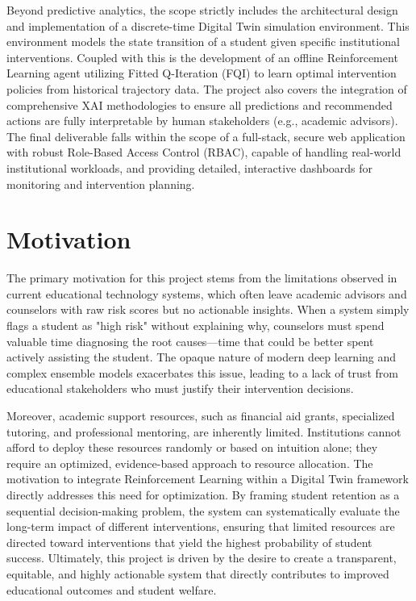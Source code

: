 \documentclass[12pt,a4paper]{report}
\begin{document}
Beyond predictive analytics, the scope strictly includes the architectural design and implementation of a discrete-time Digital Twin simulation environment. This environment models the state transition of a student given specific institutional interventions. Coupled with this is the development of an offline Reinforcement Learning agent utilizing Fitted Q-Iteration (FQI) to learn optimal intervention policies from historical trajectory data. The project also covers the integration of comprehensive XAI methodologies to ensure all predictions and recommended actions are fully interpretable by human stakeholders (e.g., academic advisors). The final deliverable falls within the scope of a full-stack, secure web application with robust Role-Based Access Control (RBAC), capable of handling real-world institutional workloads, and providing detailed, interactive dashboards for monitoring and intervention planning.

\section{Motivation}
The primary motivation for this project stems from the limitations observed in current educational technology systems, which often leave academic advisors and counselors with raw risk scores but no actionable insights. When a system simply flags a student as "high risk" without explaining why, counselors must spend valuable time diagnosing the root causes—time that could be better spent actively assisting the student. The opaque nature of modern deep learning and complex ensemble models exacerbates this issue, leading to a lack of trust from educational stakeholders who must justify their intervention decisions.

Moreover, academic support resources, such as financial aid grants, specialized tutoring, and professional mentoring, are inherently limited. Institutions cannot afford to deploy these resources randomly or based on intuition alone; they require an optimized, evidence-based approach to resource allocation. The motivation to integrate Reinforcement Learning within a Digital Twin framework directly addresses this need for optimization. By framing student retention as a sequential decision-making problem, the system can systematically evaluate the long-term impact of different interventions, ensuring that limited resources are directed toward interventions that yield the highest probability of student success. Ultimately, this project is driven by the desire to create a transparent, equitable, and highly actionable system that directly contributes to improved educational outcomes and student welfare.
\end{document}
